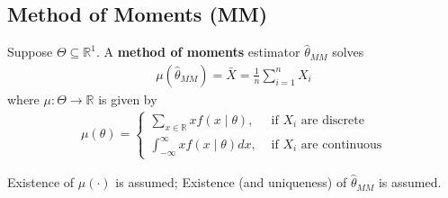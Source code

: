 \documentclass[11pt]{elegantbook}
\begin{document}
\subsection{Method of Moments (MM)}
\begin{definition}
    \normalfont
    Suppose $\Theta\subseteq \mathbb{R}^1$. A \textbf{method of moments} estimator $\hat{\theta}_{MM}$ solves
    \begin{equation}
        \begin{aligned}
            \mu(\hat{\theta}_{MM})=\bar{X}=\frac{1}{n}\sum_{i=1}^n X_i
        \end{aligned}
        \nonumber
    \end{equation}
    where $\mu: \Theta \rightarrow \mathbb{R}$ is given by
    \begin{equation}
        \begin{aligned}
            \mu(\theta)=\left\{\begin{matrix}
                \sum_{x\in \mathbb{R}}x f(x\mid \theta),& \text{ if $X_i$ are discrete}\\
                \int_{-\infty}^\infty x f(x\mid \theta) dx,& \text{ if $X_i$ are continuous}
            \end{matrix}\right.
        \end{aligned}
        \nonumber
    \end{equation}
\end{definition}
\begin{remark}
    Existence of $\mu(\cdot)$ is assumed;
    Existence (and uniqueness) of $\hat{\theta}_{MM}$ is assumed.
\end{remark}
\end{document}
